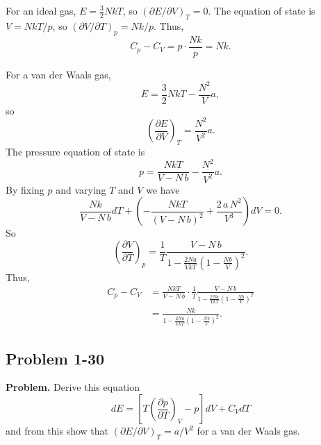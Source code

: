 \documentclass[twocolumn, 10pt]{article}
\numberwithin{equation}{section}
\newenvironment{problem}
{\par\medskip \color{problue}
  \textbf{Problem. }\ignorespaces}
{\medskip}
\newenvironment{solution}[1][\empty]
{\par\medskip\sffamily
  \textbf{\ifx\empty#1{Solution.}\relax\else{#1}\fi} \ignorespaces}
{\medskip}
\begin{document}
\begin{solution}
For an ideal gas,
$E = \frac 3 2 N k T$,
so
$( \partial E / \partial V )_T = 0$.
The equation of state is
$V = NkT/p$,
so $(\partial V/\partial T)_p = Nk/p$.
Thus,
$$
C_p - C_V = p \cdot \frac{Nk}{p} = N k.
$$

For a van der Waals gas,
$$
E = \frac{3}{2} N k T  - \frac{ N^2 } { V } a,
$$
so
$$
\left( \frac{ \partial E } {\partial V } \right)_T = \frac{ N^2 } { V^2 } a.
$$
The pressure equation of state is
$$
p = \frac{ N k T } { V - N \, b } - \frac{N^2 }{ V^2 } a.
$$
By fixing $p$ and varying $T$ and $V$ we have
$$
\frac{ N k } { V - N \, b } dT
+
\left(
- \frac{ N k T } { (V - N \, b)^2 }
+ \frac{ 2 \, a \, N^2 } { V^3 } \right) dV = 0.
$$
So
$$
\left(
\frac{ \partial V } { \partial T }
\right)_p
=
\frac{1}{T} \frac{ V - N \, b }
{1 - \frac{ 2 N a }{ V k T } \left(1 - \frac{N b}{V} \right)^2 }
.
$$
Thus,
\begin{align*}
C_p - C_V
  &=
\frac{ N k T } { V - N \, b } \cdot
\frac{1}{T} \frac{ V - N \, b }
{1 - \frac{ 2 N a }{ V k T } \left(1 - \frac{N b}{V} \right)^2 }
  \\
  &=
\frac{ N k }
{1 - \frac{ 2 N a }{ V k T } \left(1 - \frac{N b}{V} \right)^2 }
.
\end{align*}

\end{solution}




\subsection{Problem 1-30}

\begin{problem}
  Derive this equation
  \begin{equation}
  dE
  =
  \left[ T \left( \frac{ \partial p} {\partial T } \right)_V - p \right]
  dV + C_V dT
    \label{eq:dE_VT}
  \end{equation}
  and from this show that $(\partial E/\partial V)_T = a/V^2$
  for a van der Waals gas.
\end{problem}
\end{document}
